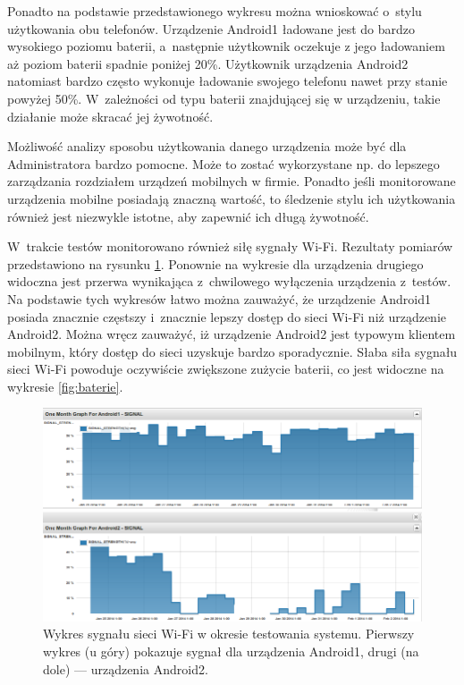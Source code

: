 Ponadto na podstawie przedstawionego wykresu można wnioskować o~stylu
użytkowania obu telefonów. Urządzenie Android1 ładowane jest do bardzo
wysokiego poziomu baterii, a~następnie użytkownik oczekuje z jego
ładowaniem aż poziom baterii spadnie poniżej 20\%. Użytkownik
urządzenia Android2 natomiast bardzo często wykonuje ładowanie swojego
telefonu nawet przy stanie powyżej 50\%. W~zależności od typu baterii
znajdującej się w urządzeniu, takie działanie może skracać jej
żywotność.

Możliwość analizy sposobu użytkowania danego urządzenia może być dla
Administratora bardzo pomocne. Może to zostać wykorzystane np. do
lepszego zarządzania rozdziałem urządzeń mobilnych w firmie. Ponadto
jeśli monitorowane urządzenia mobilne posiadają znaczną wartość, to
śledzenie stylu ich użytkowania również jest niezwykle istotne, aby
zapewnić ich długą żywotność.

W~trakcie testów monitorowano również siłę sygnały Wi-Fi. Rezultaty
pomiarów przedstawiono na rysunku \ref{fig:signals}. Ponownie na
wykresie dla urządzenia drugiego widoczna jest przerwa wynikająca
z~chwilowego wyłączenia urządzenia z~testów. Na podstawie tych
wykresów łatwo można zauważyć, że urządzenie Android1 posiada znacznie
częstszy i~znacznie lepszy dostęp do sieci Wi-Fi niż urządzenie
Android2. Można wręcz zauważyć, iż urządzenie Android2 jest typowym
klientem mobilnym, który dostęp do sieci uzyskuje bardzo
sporadycznie. Słaba siła sygnału sieci Wi-Fi powoduje oczywiście
zwiększone zużycie baterii, co jest widoczne na wykresie
\ref{fig:baterie}.

\begin{figure}[ht]
  \caption{Wykres sygnału sieci Wi-Fi w okresie testowania
    systemu. Pierwszy wykres (u góry) pokazuje sygnał dla urządzenia
    Android1, drugi (na dole) --- urządzenia Android2.}
  \label{fig:signals}
  \centering
\includegraphics[width=1\textwidth]{img/wifi.png}
\end{figure}

